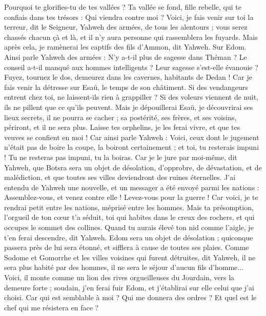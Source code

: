 \begin{multicols}{2}
Pourquoi te glorifies-tu de tes vallées ? Ta vallée se fond, fille rebelle, qui te confiais dans tes trésors : Qui viendra contre moi ?
Voici, je fais venir sur toi la terreur, dit le Seigneur, Yahweh des armées, de tous les alentours ; vous serez chassés chacun çà et là, et il n'y aura personne qui rassemblera les fuyards.
Mais après cela, je ramènerai les captifs des fils d'Ammon, dit Yahweh.
Sur Edom. Ainsi parle Yahweh des armées : N'y a-t-il plus de sagesse dans Théman ? Le conseil a-t-il manqué aux hommes intelligents ? Leur sagesse s'est-elle évanouie ?
Fuyez, tournez le dos, demeurez dans les cavernes, habitants de Dedan ! Car je fais venir la détresse sur Esaü, le temps de son châtiment.
Si des vendangeurs entrent chez toi, ne laissent-ils rien à grappiller ? Si des voleurs viennent de nuit, ils ne pillent que ce qu'ils peuvent.
Mais je dépouillerai Esaü, je découvrirai ses lieux secrets, il ne pourra se cacher ; sa postérité, ses frères, et ses voisins, périront, et il ne sera plus.
Laisse tes orphelins, je les ferai vivre, et que tes veuves se confient en moi !
Car ainsi parle Yahweh : Voici, ceux dont le jugement n’était pas de boire la coupe, la boiront certainement ; et toi, tu resterais impuni ! Tu ne resteras pas impuni, tu la boiras.
Car je le jure par moi-même, dit Yahweh, que Botsra sera un objet de désolation, d’opprobre, de dévastation, et de malédiction, et que toutes ses villes deviendront des ruines éternelles.
J'ai entendu de Yahweh une nouvelle, et un messager a été envoyé parmi les nations : Assemblez-vous, et venez contre elle ! Levez-vous pour la guerre !
Car voici, je te rendrai petit entre les nations, méprisé entre les hommes.
Mais ta présomption, l'orgueil de ton cœur t'a séduit, toi qui habites dans le creux des rochers, et qui occupes le sommet des collines. Quand tu aurais élevé ton nid comme l'aigle, je t'en ferai descendre, dit Yahweh.
Edom sera un objet de désolation ; quiconque passera près de lui sera étonné, et sifflera à cause de toutes ses plaies.
Comme Sodome et Gomorrhe et les villes voisines qui furent détruites, dit Yahweh, il ne sera plus habité par des hommes, il ne sera le séjour d'aucun fils d'homme...
Voici, il monte comme un lion des rives orgueilleuses du Jourdain, vers la demeure forte ; soudain, j'en ferai fuir Edom, et j'établirai sur elle celui que j'ai choisi. Car qui est semblable à moi ? Qui me donnera des ordres ? Et quel est le chef qui me résistera en face ?

\end{multicols}
